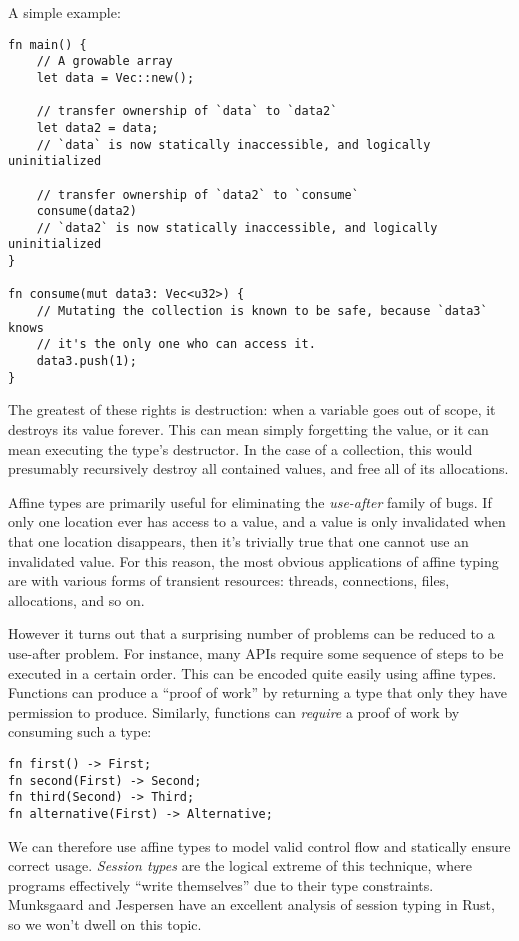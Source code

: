 A simple example:

\begin{verbatim}
fn main() {
    // A growable array
    let data = Vec::new();

    // transfer ownership of `data` to `data2`
    let data2 = data;
    // `data` is now statically inaccessible, and logically uninitialized

    // transfer ownership of `data2` to `consume`
    consume(data2)
    // `data2` is now statically inaccessible, and logically uninitialized
}

fn consume(mut data3: Vec<u32>) {
    // Mutating the collection is known to be safe, because `data3` knows
    // it's the only one who can access it.
    data3.push(1);
}
\end{verbatim}

The greatest of these rights is destruction: when a variable goes out of scope,
it destroys its value forever. This can mean simply forgetting the value,
or it can mean executing the type's destructor. In the case of a collection,
this would presumably recursively destroy all contained values, and free all of
its allocations.

Affine types are primarily useful for eliminating the \emph{use-after} family of bugs.
If only one location ever has access to a value, and a value is only invalidated
when that one location disappears, then it's trivially true that one cannot use
an invalidated value. For this reason, the most obvious applications of affine
typing are with various forms of transient resources: threads, connections,
files, allocations, and so on.

However it turns out that a surprising number of problems can be reduced to a
use-after problem. For instance, many APIs require some sequence of steps to
be executed in a certain order. This can be encoded quite easily using affine
types. Functions can produce a ``proof of work'' by returning a type that only
they have permission to produce. Similarly, functions can \emph{require} a proof
of work by consuming such a type:

\begin{verbatim}
fn first() -> First;
fn second(First) -> Second;
fn third(Second) -> Third;
fn alternative(First) -> Alternative;
\end{verbatim}

We can therefore use affine types to model valid control flow and statically
ensure correct usage. \emph{Session types} are the logical extreme of this
technique, where programs effectively ``write themselves'' due to their type
constraints. Munksgaard and Jespersen \cite{munksgaard2015practical} have an
excellent analysis of session typing in Rust, so we won't dwell on this topic.

